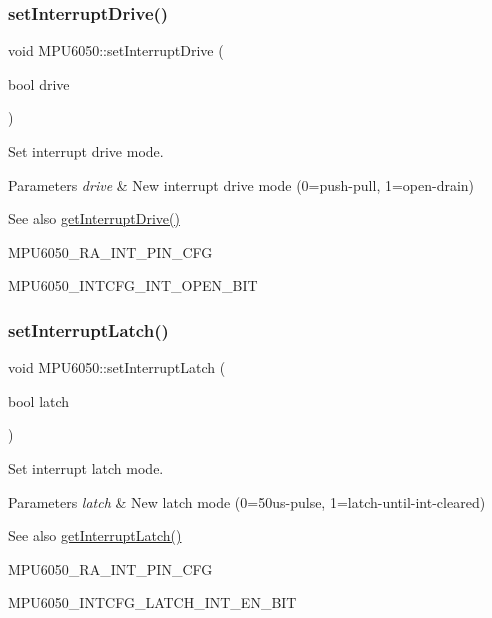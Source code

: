 \subsubsection{\texorpdfstring{setInterruptDrive()}{setInterruptDrive()}}
{\footnotesize\ttfamily void M\+P\+U6050\+::set\+Interrupt\+Drive (\begin{DoxyParamCaption}\item[{bool}]{drive }\end{DoxyParamCaption})}

Set interrupt drive mode. 
\begin{DoxyParams}{Parameters}
{\em drive} & New interrupt drive mode (0=push-\/pull, 1=open-\/drain) \\
\hline
\end{DoxyParams}
\begin{DoxySeeAlso}{See also}
\mbox{\hyperlink{class_m_p_u6050_af66e6c7b1885dcf452e73371790fddfd}{get\+Interrupt\+Drive()}} 

M\+P\+U6050\+\_\+\+R\+A\+\_\+\+I\+N\+T\+\_\+\+P\+I\+N\+\_\+\+C\+FG 

M\+P\+U6050\+\_\+\+I\+N\+T\+C\+F\+G\+\_\+\+I\+N\+T\+\_\+\+O\+P\+E\+N\+\_\+\+B\+IT 
\end{DoxySeeAlso}
\mbox{\label{class_m_p_u6050_abf9ccf9eb6c7156e6660abb76734920a}} 
\subsubsection{\texorpdfstring{setInterruptLatch()}{setInterruptLatch()}}
{\footnotesize\ttfamily void M\+P\+U6050\+::set\+Interrupt\+Latch (\begin{DoxyParamCaption}\item[{bool}]{latch }\end{DoxyParamCaption})}

Set interrupt latch mode. 
\begin{DoxyParams}{Parameters}
{\em latch} & New latch mode (0=50us-\/pulse, 1=latch-\/until-\/int-\/cleared) \\
\hline
\end{DoxyParams}
\begin{DoxySeeAlso}{See also}
\mbox{\hyperlink{class_m_p_u6050_a5502c4c2a9bc4ea9267e128b7743923d}{get\+Interrupt\+Latch()}} 

M\+P\+U6050\+\_\+\+R\+A\+\_\+\+I\+N\+T\+\_\+\+P\+I\+N\+\_\+\+C\+FG 

M\+P\+U6050\+\_\+\+I\+N\+T\+C\+F\+G\+\_\+\+L\+A\+T\+C\+H\+\_\+\+I\+N\+T\+\_\+\+E\+N\+\_\+\+B\+IT 
\end{DoxySeeAlso}
\mbox{\label{class_m_p_u6050_a2fa64c7030242aac18bd6727e8ca4a54}} 
